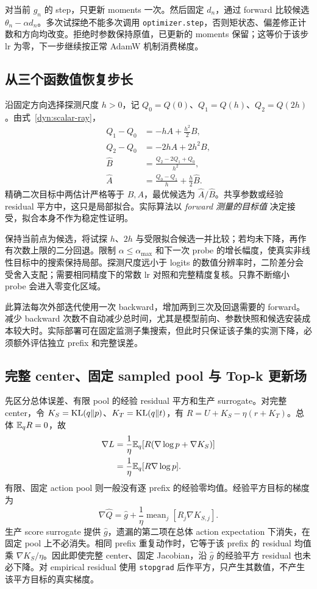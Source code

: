对当前 $g_n$ 的 step，只更新 moments 一次。然后固定 $d_n$，通过 forward 比较候选 $\theta_n-\alpha d_n$。多次试探绝不能多次调用 \texttt{optimizer.step}，否则矩状态、偏差修正计数和方向均改变。拒绝时参数保持原值，已更新的 moments 保留；这等价于该步 lr 为零，下一步继续按正常 AdamW 机制消费梯度。

\subsection{从三个函数值恢复步长}

沿固定方向选择探测尺度 $h>0$，记 $Q_0=Q(0)$、$Q_1=Q(h)$、$Q_2=Q(2h)$。由式~\eqref{dyn:scalar-ray}，
\begin{align}
Q_1-Q_0&=-hA+\frac{h^2}2B,\\
Q_2-Q_0&=-2hA+2h^2B,\\
\widehat B&=\frac{Q_2-2Q_1+Q_0}{h^2},\\
\widehat A&=\frac{Q_0-Q_1}{h}+\frac h2\widehat B.
\end{align}
精确二次目标中两估计严格等于 $B,A$，最优候选为 $\widehat A/\widehat B$。共享参数或经验 residual 平方中，这只是局部拟合。实际算法以 \emph{forward 测量的目标值} 决定接受，拟合本身不作为稳定性证明。

保持当前点为候选，将试探 $h$、$2h$ 与受限拟合候选一并比较；若均未下降，再作有次数上限的二分回退。限制 $\alpha\le\alpha_{\max}$ 和下一次 probe 的增长幅度，使真实非线性目标中的搜索保持局部。探测尺度远小于 logits 的数值分辨率时，二阶差分会受舍入支配；需要相同精度下的常数 lr 对照和完整精度复核。只靠不断缩小 probe 会进入零变化区域。

此算法每次外部迭代使用一次 backward，增加两到三次及回退需要的 forward。减少 backward 次数不自动减少总时间，尤其是模型前向、参数快照和候选安装成本较大时。实际部署可在固定监测子集搜索，但此时只保证该子集的实测下降，必须额外评估独立 prefix 和完整误差。

\subsection{完整 center、固定 sampled pool 与 Top-k 更新场}

先区分总体误差、有限 pool 的经验 residual 平方和生产 surrogate。对完整 center，令 $K_S=\operatorname{KL}(q\Vert p)$、$K_T=\operatorname{KL}(q\Vert t)$，有 $R=U+K_S-\eta(r+K_T)$。总体 $\mathbb E_q R=0$，故
\begin{align}
\nabla L
&=\frac1\eta\mathbb E_q[R(\nabla\log p+\nabla K_S)]\\
&=\frac1\eta\mathbb E_q[R\nabla\log p].
\end{align}
有限、固定 action pool 则一般没有逐 prefix 的经验零均值。经验平方目标的梯度为
\begin{equation}
\nabla\widehat Q=\widehat g+
\frac1\eta\operatorname{mean}_j[R_j\nabla K_{S,j}].
\end{equation}
生产 score surrogate 提供 $\widehat g$，遗漏的第二项在总体 action expectation 下消失，在固定 pool 上不必消失。相同 prefix 重复动作时，它等于该 prefix 的 residual 均值乘 $\nabla K_S/\eta$。因此即使完整 center、固定 Jacobian，沿 $\widehat g$ 的经验平方 residual 也未必下降。对 empirical residual 使用 \texttt{stopgrad} 后作平方，只产生其数值，不产生该平方目标的真实梯度。

